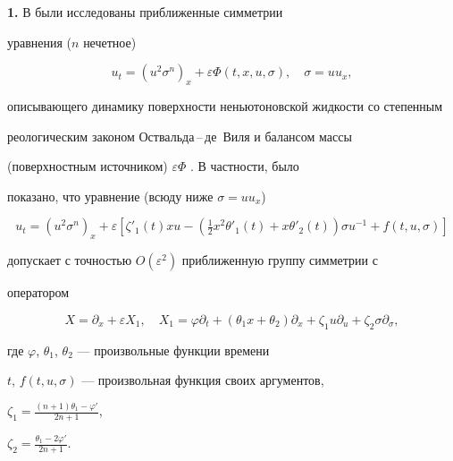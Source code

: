\maketitle 


\label{begin} 


 


 


{\bf 1.} В \cite{1} были исследованы приближенные симметрии 


уравнения ($n$ нечетное) 


$$ 


u_t=(u^2\sigma^n)_x+\varepsilon\Phi(t,x,u,\sigma),\quad 


\sigma=uu_x, 


$$ 


описывающего динамику поверхности неньютоновской жидкости со степенным 


реологическим законом Оствальда\,--\,де~Виля и балансом массы 


(поверхностным источником) $\varepsilon\Phi$ \cite{2}. В частности, было 


показано, что уравнение (всюду ниже $\sigma=uu_x$) 


\begin{equation} 


u_t=(u^2\sigma^n)_x+\varepsilon[\zeta'_1(t)x u- 


(\tfrac{1}{2}x^2\theta'_1(t)+x\theta'_2(t))\sigma u^{-1} 


+f(t,u,\sigma)] \tag{1.1} 


\end{equation} 


допускает с точностью $O(\varepsilon^2)$ приближенную группу симметрии с 


оператором 


$$ 


X=\partial_x+\varepsilon X_1,\quad X_1=\varphi\partial_t+ 


(\theta_1x+\theta_2)\partial_x+\zeta_1u\partial_u+ 


\zeta_2\sigma\partial_\sigma, 


$$ 


где $\varphi$, $\theta_1$, $\theta_2$ --- произвольные функции времени 


$t$, $f(t,u,\sigma)$ --- произвольная функция своих аргументов, 


$\zeta_1=\frac{(n+1)\theta_1-\varphi'}{2n+1}$, 


$\zeta_2=\frac{\theta_1-2\varphi'}{2n+1}$. 


